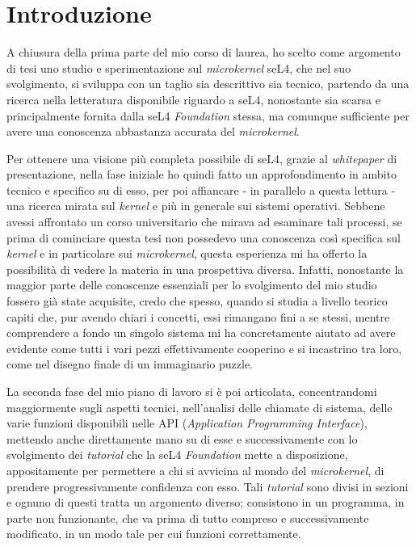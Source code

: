 \chapter{Introduzione}
A chiusura della prima parte del mio corso di laurea, ho scelto come argomento di tesi uno studio e sperimentazione sul \textit{microkernel} seL4, che nel suo svolgimento, si sviluppa con un taglio sia descrittivo sia tecnico, partendo da una ricerca nella letteratura disponibile riguardo a seL4, nonostante sia scarsa e principalmente fornita dalla seL4 \textit{Foundation} stessa, ma comunque sufficiente per avere una conoscenza abbastanza accurata del \textit{microkernel}.

Per ottenere una visione più completa possibile di seL4, grazie al \textit{whitepaper} \cite{sel4-whitepaper} di presentazione, nella fase iniziale ho quindi fatto un approfondimento in ambito tecnico e specifico su di esso, per poi affiancare - in parallelo a questa lettura - una ricerca mirata sul \textit{kernel} e più in generale sui sistemi operativi. Sebbene avessi affrontato un corso universitario che mirava ad esaminare tali processi, se prima di cominciare questa tesi non possedevo una conoscenza così specifica sul \textit{kernel} e in particolare sui \textit{microkernel}, questa esperienza mi ha offerto la possibilità di vedere la materia in una prospettiva diversa. Infatti, nonostante la maggior parte delle conoscenze essenziali per lo svolgimento del mio studio fossero già state acquisite, credo che spesso, quando si studia a livello teorico capiti che, pur avendo chiari i concetti, essi rimangano fini a se stessi, mentre comprendere a fondo un singolo sistema mi ha concretamente aiutato ad avere evidente come tutti i vari pezzi effettivamente cooperino e si incastrino tra loro, come nel disegno finale di un immaginario puzzle.

La seconda fase del mio piano di lavoro si è poi articolata, concentrandomi maggiormente sugli aspetti tecnici, nell'analisi delle chiamate di sistema, delle varie funzioni disponibili nelle API (\textit{Application Programming Interface}), mettendo anche direttamente mano su di esse e successivamente con lo svolgimento dei \textit{tutorial} che la seL4 \textit{Foundation} mette a disposizione, appositamente per permettere a chi si avvicina al mondo del \textit{microkernel}, di prendere progressivamente confidenza con esso. Tali \textit{tutorial} sono divisi in sezioni e ognuno di questi tratta un argomento diverso; consistono in un programma, in parte non funzionante, che va prima di tutto compreso e successivamente modificato, in un modo tale per cui funzioni correttamente.

